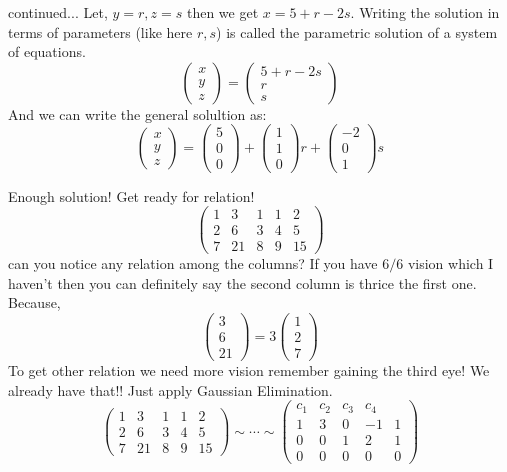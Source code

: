 \documentclass[11pt]{beamer}
\theoremstyle{plain}
\begin{document}
\begin{frame}{continued...}
    Let, $y=r, z=s$ then we get $x= 5+r-2s$. Writing the solution in terms of parameters (like here $r,s$) is called the parametric solution of a system of equations.
$$
\begin{pmatrix}
    x\\y\\z
\end{pmatrix}=\begin{pmatrix}
    5+r-2s\\
    r\\
    s
\end{pmatrix}
$$
\pause
And we can write the general solultion as:$$
\begin{pmatrix}
    x\\y\\z
\end{pmatrix}=\begin{pmatrix}
    5\\
    0\\
    0
\end{pmatrix}+\begin{pmatrix}
    1\\1\\0
\end{pmatrix}r+\begin{pmatrix}
    -2\\0\\1
\end{pmatrix}s
$$
\end{frame}
\begin{frame}{Enough solution! Get ready for relation!}
    $$
\left(\begin{array}{cccc|c}
1 & 3 & 1 &1 & 2 \\
2 & 6 & 3 &4 & 5 \\
7 & 21 & 8 &9 & 15
\end{array}\right)
    $$
can you notice any relation among the columns? \pause If you have $6/6$ vision which I haven't then you can definitely say the second column is thrice the first one. Because,
$$
\begin{pmatrix}
    3\\6\\21
\end{pmatrix}=3\begin{pmatrix}
    1\\2\\7
\end{pmatrix}
$$
\pause
To get other relation we need more vision remember gaining the third eye! We already have that!! Just apply Gaussian Elimination.
$$
\left(\begin{array}{cccc|c}
1 & 3 & 1 &1 & 2 \\
2 & 6 & 3 &4 & 5 \\
7 & 21 & 8 &9 & 15
\end{array}\right)\sim\cdots\sim 
\left(\begin{array}{cccc|c}
\text{$c_1$} & \text{$c_2$} & \text{$c_3$} & \text{$c_4$} & \\
1 & 3 & 0 & -1&1\\
0 & 0 & 1 & 2 &1\\
0 & 0 & 0 & 0 &0
\end{array}\right)
$$
\end{frame}
\end{document}
